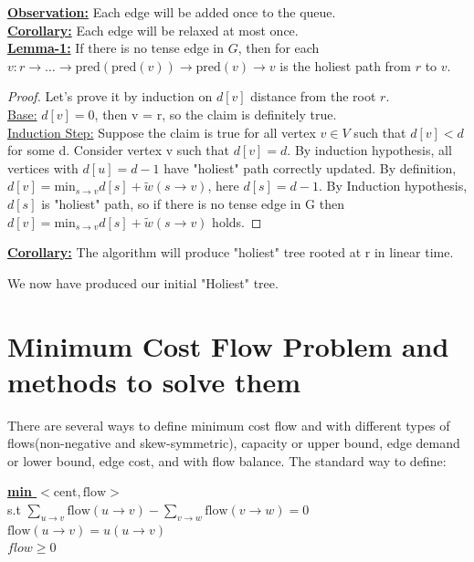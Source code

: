\documentclass{article}
\begin{document}
\textbf{\underline{Observation:}} Each edge will be added once to the queue. \\

\textbf{\underline{Corollary:}} Each edge will be relaxed at most once. \\

\textbf{\underline{Lemma-1:}} If there is no tense edge in $G$, then for each 
$v: r \rightarrow \ldots \rightarrow \text{pred}(\text{pred}(v)) \rightarrow 
\text{pred}(v) \rightarrow v$ is the holiest path from $r$ to $v$.

\begin{proof} Let's prove it by induction on $d[v]$ distance from the root $r$. \\
\underline{Base:} $d[v] = 0$, then v = r, so the claim is definitely true. \\
\underline{Induction Step:} Suppose the claim is true for all vertex $v \in V$ 
such that $d[v] < d$ for some d. Consider vertex v such that $d[v] = d$. 
By induction hypothesis, all vertices with $d[u] = d-1$ have "holiest" path 
correctly updated. By definition, $d[v] = \text{min}_{s \rightarrow v}{d[s] + 
\tilde w(s \rightarrow v)}$, here $d[s] = d-1$. By Induction hypothesis, $d[s]$ 
is "holiest" path, so if there is no tense edge in G then 
$d[v] = \text{min}_{s \rightarrow v}{d[s] + \tilde w(s \rightarrow v)}$ holds.
\end{proof}

\textbf{\underline{Corollary:}} The algorithm will produce "holiest" tree rooted at r in linear time.

We now have produced our initial "Holiest" tree.

\section{Minimum Cost Flow Problem and methods to solve them}
There are several ways to define minimum cost flow and with different types of 
flows(non-negative and skew-symmetric), capacity or upper bound, edge demand or 
lower bound, edge cost, and with flow balance. The standard way to define:
\begin{center}
\begin{algorithm}
\textbf{\underline{min $< \text{cent}, \text{flow}>$}} \\
  s.t  $\sum \limits_{u \rightarrow v} \text{flow} 
  (u \rightarrow v) - \sum \limits_{v \rightarrow w} \text{flow} (v \rightarrow w)= 0 $  \\ 
  \qquad
       $\text{flow}(u \rightarrow v) = u(u \rightarrow v)$ \\ \qquad
       $flow \geq 0$
\end{algorithm}
\end{center}
\end{document}

